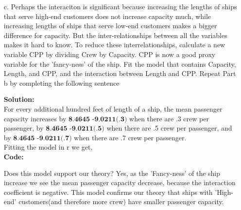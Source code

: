 \documentclass[12pt]{article}
\makeatletter
\theoremstyle{homework}
\newenvironment{exercise}[1]
{\def\@currentlabel{#1}\exercisecore}
{\endexercisecore}
\newcommand{\localhead}[1]{\par\smallskip\noindent\textbf{#1}\nobreak\\}%
\newcommand\solution{\localhead{Solution:}}
\makeatother
\begin{document}
\begin{exercise}{3.}
\begin{enumerate}
    \item[c.] Perhaps the interaciton is significant because increasing the lengths of ships that serve high-end customers
    does not increase capacity much, while increasing lengths of ships that serve low-end customers makes a bigger difference for capacity. But 
    the inter-relationships between all the variables makes it hard to know. To reduce these interrelationships, calculate a new 
    variable CPP by dividing Crew by Capacity. CPP is now a good proxy variable for the 'fancy-ness' of the ship. Fit the model that contains 
    Capacity, Length, and CPP, and the interaction between Length and CPP. Repeat Part b by completing the following sentence\\
    \solution For every additional hundred feet of length of a ship, the mean passenger capacity increases by $\textbf{8.4645  -9.0211(.3)}$
    when there are .3 crew per passenger, by $\textbf{8.4645  -9.0211(.5)}$ when there are .5 crew per passenger, and by $\textbf{8.4645  -9.0211(.7)}$ when there are .7 crew per passenger.\\
    Fitting the model in r we get, \\
    \textbf{Code:}
    \begin{center}
    
    \end{center}
    Does this model support our theory? Yes, as the 'Fancy-ness' of the ship increase we see the mean passenger capacity decrease, because the interaction 
    coefficient is negative. This model confirms our theory that ships with 'High-end' customers(and therefore more crew) have smaller passenger capacity. 
    \newpage
    

\end{enumerate}
\end{exercise}
\end{document}
